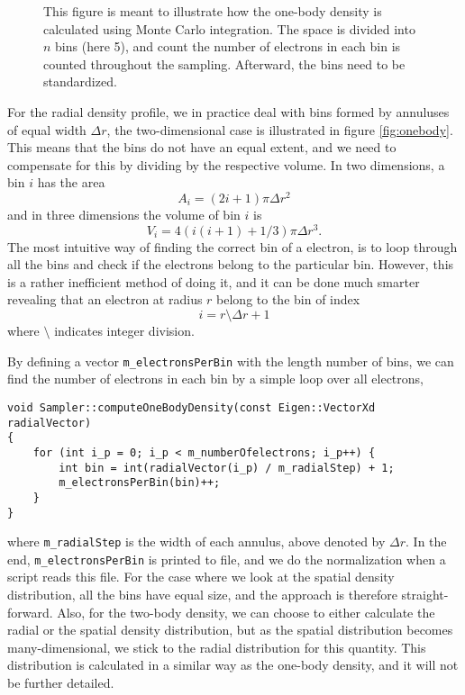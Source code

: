 \begin{figure}
	\centering
	
	\caption{This figure is meant to illustrate how the one-body density is calculated using Monte Carlo integration. The space is divided into $n$ bins (here 5), and count the number of electrons in each bin is counted throughout the sampling. Afterward, the bins need to be standardized.}
	\label{fig:onebody}
\end{figure}
For the radial density profile, we in practice deal with bins formed by annuluses of equal width $\Delta r$, the two-dimensional case is illustrated in figure \eqref{fig:onebody}. This means that the bins do not have an equal extent, and we need to compensate for this by dividing by the respective volume. In two dimensions, a bin $i$ has the area
\begin{equation}
A_i=(2i+1)\pi \Delta r^2
\end{equation}
and in three dimensions the volume of bin $i$ is
\begin{equation}
V_i=4(i(i+1)+1/3)\pi \Delta r^3.
\end{equation}
The most intuitive way of finding the correct bin of a electron, is to loop through all the bins and check if the electrons belong to the particular bin. However, this is a rather inefficient method of doing it, and it can be done much smarter revealing that an electron at radius $r$ belong to the bin of index
\begin{equation}
i=r\setminus \Delta r + 1
\end{equation}
where $\setminus$ indicates integer division. 

By defining a vector \lstinline|m_electronsPerBin| with the length number of bins, we can find the number of electrons in each bin by a simple loop over all electrons,
\begin{lstlisting}
void Sampler::computeOneBodyDensity(const Eigen::VectorXd radialVector)
{
	for (int i_p = 0; i_p < m_numberOfelectrons; i_p++) {
		int bin = int(radialVector(i_p) / m_radialStep) + 1;
		m_electronsPerBin(bin)++;
	}
}
\end{lstlisting}
where \lstinline|m_radialStep| is the width of each annulus, above denoted by $\Delta r$. In the end, \lstinline|m_electronsPerBin| is printed to file, and we do the normalization when a script reads this file. For the case where we look at the spatial density distribution, all the bins have equal size, and the approach is therefore straight-forward. Also, for the two-body density, we can choose to either calculate the radial or the spatial density distribution, but as the spatial distribution becomes many-dimensional, we stick to the radial distribution for this quantity. This distribution is calculated in a similar way as the one-body density, and it will not be further detailed. 

